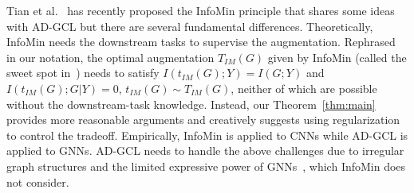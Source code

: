 Tian et al.~\cite{tian2020makes} has recently proposed the InfoMin principle that shares some ideas with AD-GCL but there are several fundamental differences. Theoretically, InfoMin needs the downstream tasks to supervise the augmentation. Rephrased in our notation, the optimal augmentation $T_{IM}(G)$ given by InfoMin (called the sweet spot in~\cite{tian2020makes}) needs to satisfy $I(t_{IM}(G);Y) = I(G;Y)$ and $I(t_{IM}(G);G|Y)=0$, $t_{IM}(G)\sim T_{IM}(G)$, neither of which are possible without the downstream-task knowledge. Instead, our Theorem~\ref{thm:main} provides more reasonable arguments and creatively suggests using regularization to control the tradeoff. Empirically, InfoMin is applied to CNNs while AD-GCL is applied to GNNs. AD-GCL needs to handle the above challenges due to irregular graph structures and the limited expressive power of GNNs~\cite{xu2018powerful,morris2019weisfeiler}, which InfoMin does not consider. 


